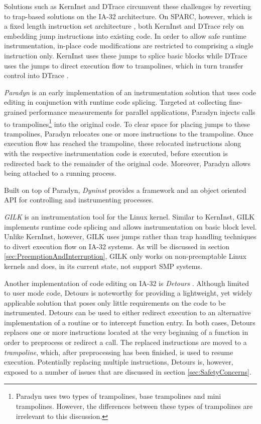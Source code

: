 Solutions such as KernInst and DTrace circumvent these challenges by reverting to
trap-based solutions on the IA-32 architecture. On SPARC, however, which is a
fixed length instruction set architecture \cite{SparcP07}, 
both KernInst and DTrace rely on embedding jump instructions into existing
code. In order to allow safe runtime instrumentation, 
in-place code modifications are restricted to comprising a single 
instruction only. KernInst uses these jumps to splice basic blocks while DTrace uses the jumps to
direct execution flow to trampolines, which in turn transfer control into 
DTrace \cite{Cantrill04}.

\emph{Paradyn} \cite{hollingsworth94dynamic} is an early 
implementation of an instrumentation solution that uses code editing in conjunction with runtime code splicing.
Targeted at collecting fine-grained performance measurements for parallel applications,
Paradyn injects calls to trampolines\footnote{Paradyn uses two types of trampolines,
base trampolines and mini trampolines. However, the differences between these types
of trampolines are irrelevant to this discussion.} into the original code. To clear
space for placing jumps to these trampolines, Paradyn relocates one or more instructions
to the trampoline. Once execution flow has reached the trampoline, these relocated
instructions along with the respective instrumentation code is executed, before
execution is redirected back to the remainder of the original code. Moreover, 
Paradyn allows being attached to a running process.


Built on top of Paradyn, \emph{Dyninst} \cite{Dyninst00} provides a framework and an object
oriented API for controlling and instrumenting processes.


\emph{GILK} \citep{Pearce00,Pearce02} is an instrumentation tool for the Linux kernel. Similar to KernInst,
GILK implements runtime code splicing and allows instrumentation on basic block
level. Unlike KernInst, however, GILK uses jumps rather than trap handling 
techniques to divert execution flow on IA-32 systems. As will be discussed in section 
\ref{sec:PreemptionAndInterruption}, GILK only works on non-preemptable Linux 
kernels and does, in its current state, not support SMP systems.

Another implementation of code editing on IA-32 is \emph{Detours} \cite{Brubacher99}. 
Although limited to user mode code, Detours is noteworthy for providing 
a lightweight, yet widely applicable solution that poses only little 
requirements on the code to be instrumented. Detours can be used to either
redirect execution to an alternative implementation of a routine or to intercept
function entry. In both cases, Detours replaces one or more instructions located
at the very beginning of a function in 
order to preprocess or redirect a call. The replaced instructions are moved 
to a \emph{trampoline}, which, after preprocessing has been finished, is 
used to resume execution. Potentially replacing multiple instructions, Detours 
is, however, exposed to a number of issues that are discussed in 
section \ref{sec:SafetyConcerns}.

